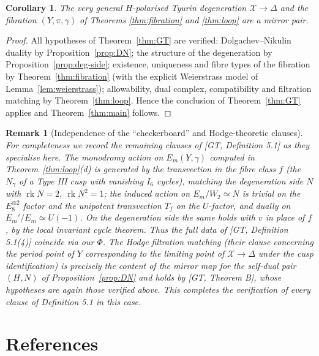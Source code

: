 \documentclass[11pt]{article}
\newtheorem{corollary}[theorem]{Corollary}
\newtheorem{remark}[theorem]{Remark}
\newcommand{\X}{\mathcal{X}}
\newcommand{\D}{\Delta}
\DeclareMathOperator{\rk}{rk}
\begin{document}
\begin{corollary}\label{cor:final}
The very general $H$-polarised Tyurin degeneration $\X\to\D$ and the
fibration $(Y,\pi,\gamma)$ of Theorems \ref{thm:fibration} and
\ref{thm:loop} are a mirror pair.
\end{corollary}

\begin{proof}
All hypotheses of Theorem~\ref{thm:GT} are verified:
Dolgachev--Nikulin duality by Proposition~\ref{prop:DN}; the structure of
the degeneration by Proposition~\ref{prop:deg-side}; existence, uniqueness
and fibre types of the fibration by Theorem~\ref{thm:fibration} (with the
explicit Weierstrass model of Lemma~\ref{lem:weierstrass}); allowability,
dual complex, compatibility and filtration matching by
Theorem~\ref{thm:loop}. Hence the conclusion of Theorem~\ref{thm:GT}
applies and Theorem~\ref{thm:main} follows.
\end{proof}

\begin{remark}[Independence of the ``checkerboard'' and Hodge-theoretic
clauses]
For completeness we record the remaining clauses of [GT, Definition 5.1]
as they specialise here. The monodromy action on $E_m(Y,\gamma)$ computed
in Theorem~\ref{thm:loop}(d) is generated by the transvection in the fibre
class $f$ (the $N_\gamma$ of a Type III cusp with vanishing $I_6$
cycles), matching the degeneration side $N$ with $\rk N = 2$, $\rk N^2=1$;
the induced action on $E_m/W_2\simeq N$ is trivial on the $E_8^{\oplus2}$
factor and the unipotent transvection $T_f$ on the $U$-factor, and dually
on $E_m'/E_m\simeq U(-1)$. On the degeneration side the same holds with $v$
in place of $f$, by the local invariant cycle theorem. Thus the full data
of [GT, Definition 5.1(4)] coincide via our $\Phi$. The Hodge filtration
matching (their clause concerning the period point of $Y$ corresponding to
the limiting point of $\X\to\D$ under the cusp identification) is
precisely the content of the mirror map for the self-dual pair
$(H,N)$ of Proposition~\ref{prop:DN} and holds by [GT, Theorem B], whose
hypotheses are again those verified above. This completes the verification
of every clause of Definition 5.1 in this case.
\end{remark}

\section*{References}
\end{document}
